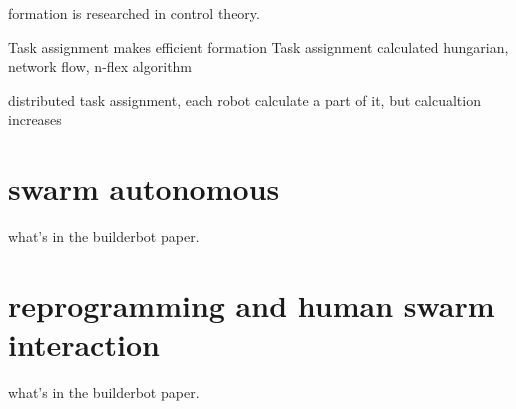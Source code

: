 formation is researched in control theory.

Task assignment makes efficient formation
Task assignment calculated hungarian, network flow, n-flex algorithm

distributed task assignment, each robot calculate a part of it, but calcualtion increases

\section{swarm autonomous}

what's in the builderbot paper.

\section{reprogramming and human swarm interaction}

what's in the builderbot paper.
